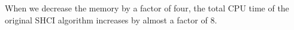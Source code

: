 \documentclass[%
reprint,
 superscriptaddress,
 amsmath,amssymb,
 aps,
]{revtex4-1}
\begin{document}
When we decrease the memory by a factor of four, the total CPU time of the original SHCI algorithm increases by almost a factor of 8.

\end{document}
